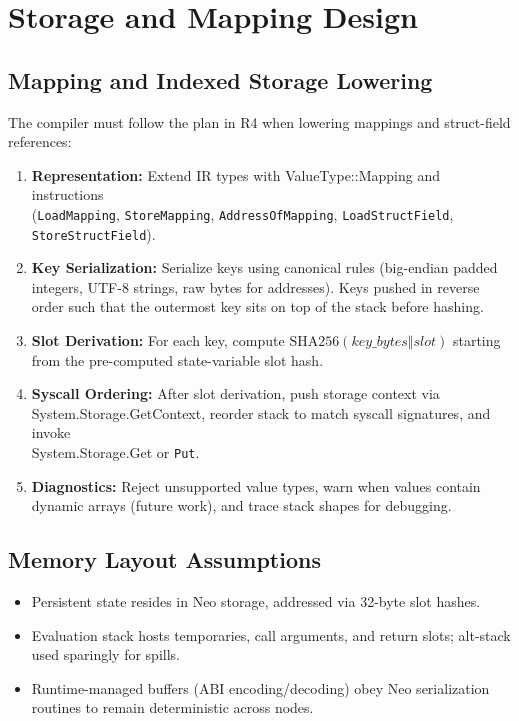 \documentclass[11pt]{article}
\begin{document}
\section{Storage and Mapping Design}
\subsection{Mapping and Indexed Storage Lowering}
The compiler must follow the plan in R4 when lowering mappings and struct-field references:
\begin{enumerate}
\item \textbf{Representation:} Extend IR types with ValueType::Mapping and instructions\\
(\texttt{LoadMapping}, \texttt{StoreMapping}, \texttt{AddressOfMapping}, \texttt{LoadStructField}, \texttt{StoreStructField}).
    \item \textbf{Key Serialization:} Serialize keys using canonical rules (big-endian padded integers, UTF-8 strings, raw bytes for addresses). Keys pushed in reverse order such that the outermost key sits on top of the stack before hashing.
    \item \textbf{Slot Derivation:} For each key, compute \(\mathrm{SHA256}(key\_bytes \Vert slot)\) starting from the pre-computed state-variable slot hash.
    \item \textbf{Syscall Ordering:} After slot derivation, push storage context via\\
    System.Storage.\allowbreak GetContext, reorder stack to match syscall signatures, and invoke\\
    System.Storage.\allowbreak Get or \texttt{Put}.
    \item \textbf{Diagnostics:} Reject unsupported value types, warn when values contain dynamic arrays (future work), and trace stack shapes for debugging.
\end{enumerate}

\subsection{Memory Layout Assumptions}
\begin{itemize}
    \item Persistent state resides in Neo storage, addressed via 32-byte slot hashes.
    \item Evaluation stack hosts temporaries, call arguments, and return slots; alt-stack used sparingly for spills.
    \item Runtime-managed buffers (ABI encoding/decoding) obey Neo serialization routines to remain deterministic across nodes.
\end{itemize}
\end{document}

